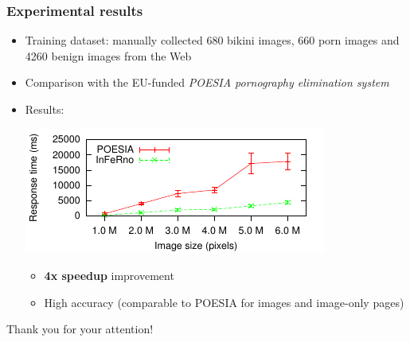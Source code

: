 \documentclass{beamer}
\begin{document}
\begin{frame}
\frametitle{Experimental results}
	\begin{itemize}
		\item Training dataset: manually collected 680 bikini images, 
		      660 porn images and 4260 benign images from the Web
		\item Comparison with the EU-funded {\em POESIA pornography elimination system}
		\item Results:
	          \begin{center}
		             \includegraphics[scale=1.3]{images/scatter-p-t-all-bars.pdf}
	          \end{center}
			  \begin{itemize}
	                \item \textbf{4x speedup} improvement 
                    \item High accuracy (comparable to POESIA for images and image-only pages)
	          \end{itemize}
	\end{itemize}
\end{frame}

\begin{frame}
	\centerline{Thank you for your attention! \smiley}
\end{frame}
\end{document}
